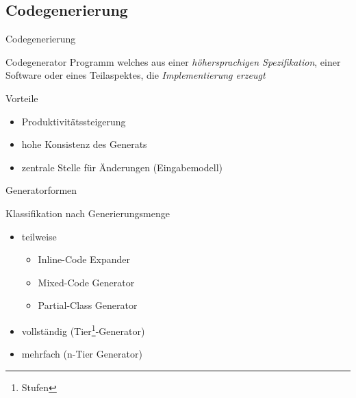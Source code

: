 \subsection{Codegenerierung}
\begin{frame}{Codegenerierung}

    \begin{block}{Codegenerator}
        Programm welches aus einer \emph{höhersprachigen Spezifikation}, einer Software oder eines Teilaspektes, die \emph{Implementierung erzeugt}
    \end{block}
    \begin{block}{Vorteile}
        \begin{itemize}
            \item Produktivitätssteigerung
            \item hohe Konsistenz des Generats
            \item zentrale Stelle für Änderungen (Eingabemodell)
        \end{itemize}
    \end{block}
\end{frame}

\begin{frame}{Generatorformen}
    \begin{block}{Klassifikation nach Generierungsmenge}
        \begin{itemize}
            \item teilweise
            \begin{itemize}
                \item Inline-Code Expander
                \item Mixed-Code Generator
                \item Partial-Class Generator
            \end{itemize}
            \item vollständig (Tier\footnote{Stufen}-Generator)
            \item mehrfach (n-Tier Generator)
        \end{itemize}
    \end{block}
\end{frame}

